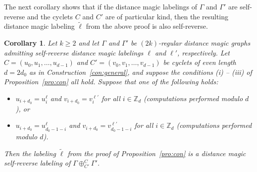 \documentclass[11 pt,english]{article}
\newcommand{\ZZ}{\mathbb{Z}}
\newcommand{\G}{\Gamma}
\newtheorem{corollary}[theorem]{Corollary}
\theoremstyle{definition}
\begin{document}
The next corollary shows that if the distance magic labelings of $\G$ and $\G'$ are self-reverse and the cyclets $C$ and $C'$ are of particular kind, then the resulting distance magic labeling $\tilde{\ell}$ from the above proof is also self-reverse. 

\begin{corollary}
\label{cor:SRcon}
Let $k \geq 2$ and let $\G$ and $\G'$ be $(2k)$-regular distance magic graphs admitting self-reverse distance magic labelings $\ell$ and $\ell'$, respectively. Let $C = (u_0, u_1, \ldots , u_{d-1})$ and $C' = (v_0, v_1, \ldots , v_{d - 1})$ be cyclets of even length $d = 2d_0$ as in Construction~\ref{con:general}, and suppose the conditions (i) -- (iii) of Proposition~\ref{pro:con} all hold. Suppose that one of the following holds:
\begin{itemize}
\item[(i)] $u_{i+d_0} = u_i^\ell$ and $v_{i+d_0} = v_i^{\ell'}$ for all $i \in \ZZ_d$ (computations performed modulo $d$), or
\item[(ii)] $u_{i+d_0} = u_{d_0-1-i}^\ell$ and $v_{i+d_0} = v_{d_0-1-i}^{\ell'}$ for all $i \in \ZZ_d$ (computations performed modulo $d$).
\end{itemize}  
Then the labeling $\tilde{\ell}$ from the proof of Proposition~\ref{pro:con} is a distance magic self-reverse labeling of $\G\oplus^{C}_{C'} \G'$.
\end{corollary}
\end{document}
